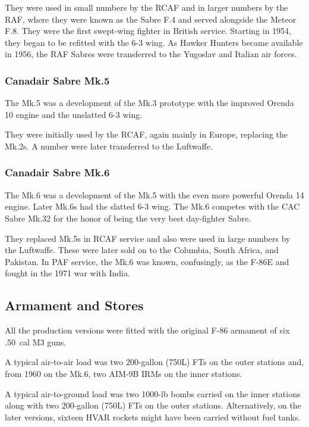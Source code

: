 They were used in small numbers by the RCAF and in larger numbers by the RAF, where they were known as the Sabre F.4 and served alongside the Meteor F.8. They were the first swept-wing fighter in British service. Starting in 1954, they began to be refitted with the 6-3 wing. As Hawker Hunters became available in 1956, the RAF Sabres were transferred to the Yugoslav and Italian air forces.

\subsubsection{Canadair Sabre Mk.5}

The Mk.5 was a development of the Mk.3 prototype with the improved Orenda 10 engine and the unslatted 6-3 wing.

They were initially used by the RCAF, again mainly in Europe, replacing the Mk.2s. A number were later transferred to the Luftwaffe.

\subsubsection{Canadair Sabre Mk.6}

The Mk.6 was a development of the Mk.5 with the even more powerful Orenda 14 engine. Later Mk.6s had the slatted 6-3 wing. The Mk.6 competes with the CAC Sabre Mk.32 for the honor of being the very best day-fighter Sabre.

They replaced Mk.5s in RCAF service and also were used in large numbers by the Luftwaffe. These were later sold on to the Columbia, South Africa, and Pakistan. In PAF service, the Mk.6 was known, confusingly, as the F-86E and fought in the 1971 war with India.

\subsection{Armament and Stores}

All the production versions were fitted with the original F-86 armament of six .50~cal M3 guns.

A typical air-to-air load was two 200-gallon (750L) FTs on the outer stations and, from 1960 on the Mk.6, two AIM-9B IRMs on the inner stations.

A typical air-to-ground load was two 1000-lb bombs carried on the inner stations along with two 200-gallon (750L) FTs on the outer stations. Alternatively, on the later versions, sixteen HVAR rockets might have been carried without fuel tanks.


